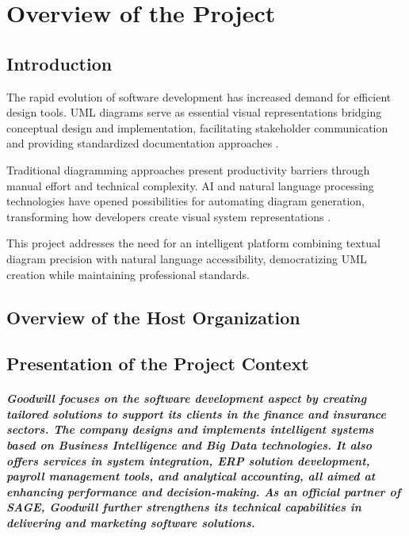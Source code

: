 \chapter[Overview]{Overview of the Project}

\minitoc

\section{Introduction}

The rapid evolution of software development has increased demand for efficient design tools. UML diagrams serve as essential visual representations bridging conceptual design and implementation, facilitating stakeholder communication and providing standardized documentation approaches \cite{uml_importance}.

Traditional diagramming approaches present productivity barriers through manual effort and technical complexity. AI and natural language processing technologies have opened possibilities for automating diagram generation, transforming how developers create visual system representations \cite{ai_diagramming}.

This project addresses the need for an intelligent platform combining textual diagram precision with natural language accessibility, democratizing UML creation while maintaining professional standards.

\section{Overview of the Host Organization}

\section{Presentation of the Project Context}
\paragraph{Goodwill focuses on the software development aspect by creating tailored solutions to support its clients in the finance and insurance sectors. The company designs and implements intelligent systems based on Business Intelligence and Big Data technologies. It also offers services in system integration, ERP solution development, payroll management tools, and analytical accounting, all aimed at enhancing performance and decision-making. As an official partner of SAGE, Goodwill further strengthens its technical capabilities in delivering and marketing software solutions.}
